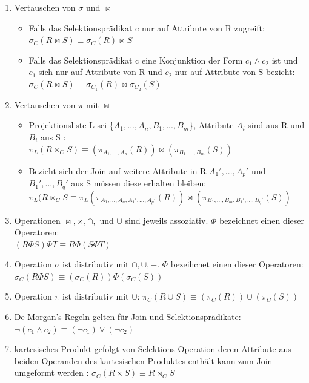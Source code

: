 \documentclass[a4paper]{article}
\begin{document}
\begin{enumerate}
        \item Vertauschen von $\sigma$ und $\bowtie$
        \begin{itemize}
            \item Falls das Selektionsprädikat c nur auf Attribute von R zugreift: $\sigma_C (R \bowtie S) \equiv \sigma_C(R) \bowtie S$
            \item Falls das Selektionsprädikat c eine Konjunktion der Form $c_1 \wedge c_2$ ist und $c_1$ sich nur auf Attribute von R und $c_2$ nur auf Attribute von S bezieht: $\sigma_C (R \bowtie S) \equiv \sigma_{C_1}(R) \bowtie \sigma_{C_2}(S)$
        \end{itemize}
        
        \item Vertauschen von $\pi$ mit $\bowtie$
        \begin{itemize}
            \item Projektionsliste L sei \{$A_1,...,A_n,B_1,...,B_m$\}, Attribute $A_i$ sind aus R und $B_i$ aus S :  \\ 
            $\pi_L (R \bowtie_C S) \equiv (\pi_{A_1,...,A_n}(R)) \bowtie (\pi_{B_1,...,B_m}(S))$
            \item Bezieht sich der Join auf weitere Attribute in R $A_1',...,A_p'$ und $B_1',...,B_q'$ aus S müssen diese erhalten bleiben: \\
            $\pi_L (R \bowtie_C S \equiv \pi_L (\pi_{A_1,...,A_n,A_1',...,A_p'}(R)) \bowtie (\pi_{B_1,...,B_m,B_1',...,B_q'}(S))$
        \end{itemize}
        
        \item Operationen $\bowtie, \times, \cap,$ und $\cup$ sind jeweils assoziativ. $\Phi$ bezeichnet einen dieser Operatoren: \\
        $(R \Phi S) \Phi T \equiv R \Phi (S \Phi T)$
        
        \item Operation $\sigma$ ist distributiv  mit $\cap, \cup, -$. $\Phi$ bezeihcnet einen dieser Operatoren: \\
        $\sigma_C (R \Phi S) \equiv (\sigma_C(R))\Phi(\sigma_C(S))$
        \item Operation $\pi$ ist distributiv mit $\cup$: $\pi_C (R \cup S) \equiv (\pi_C(R))\cup(\pi_C(S))$
        \item De Morgan's Regeln gelten für Join und Selektionsprädikate: $\lnot (c_1 \land c_2) \equiv (\lnot c_1) \lor (\lnot c_2)$
        \item kartesisches Produkt gefolgt von Selektions-Operation deren Attribute aus beiden Operanden des kartesischen Produktes enthält kann zum Join umgeformt werden : $\sigma_C (R \times S) \equiv R \bowtie_C S$
    \end{enumerate}
\end{document}
